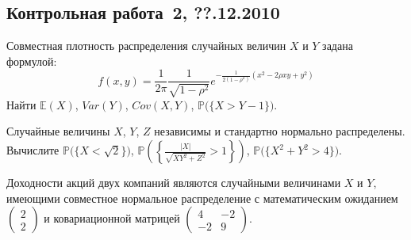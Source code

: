 \documentclass[pdftex,12pt,a4paper]{article}
\newenvironment{enumerate*}{
\begin{enumerate}
  \setlength{\itemsep}{0pt}
  \setlength{\parskip}{0pt}
  \setlength{\parsep}{0pt}
}{\end{enumerate}}
\newcommand{\ofbr}[1]{\bigl( \{ #1 \} \bigr)}     %
\begin{document}
\subsection{Контрольная работа \No\,2, ??.12.2010}
\begin{enumerate*}
\item Совместная плотность распределения случайных величин $X$ и $Y$ задана формулой:
\[
f(x,y)=\frac{1}{2\pi}\frac{1}{\sqrt{1-\rho^2}}e^{-\frac{1}{2(1-\rho^2)}\left(x^2-2\rho xy+y^2\right)}
\]
Найти $\mathbb{E}(X)$, $Var(Y)$, $Cov(X,Y)$, $\mathbb{P}\ofbr{X>Y-1}$.
\item Случайные величины $X$, $Y$, $Z$ независимы и стандартно нормально распределены. Вычислите
$\mathbb{P}\ofbr{X<\sqrt2}$, $\mathbb{P}\left(\left\{ \frac{|X|}{\sqrt{XY^2+Z^2}}>1\right\}\right)$, $\mathbb{P}\ofbr{X^2+Y^2>4}$.
\item Доходности акций двух компаний являются случайными величинами $X$ и $Y$, имеющими совместное нормальное распределение с математическим ожиданием $\left( \begin{array}{c}2\\2\end{array}\right)$ и ковариационной матрицей $\left( \begin{array}{cc}4 & -2\\-2 & 9\end{array}\right)$.


\end{enumerate*}
\end{document}
